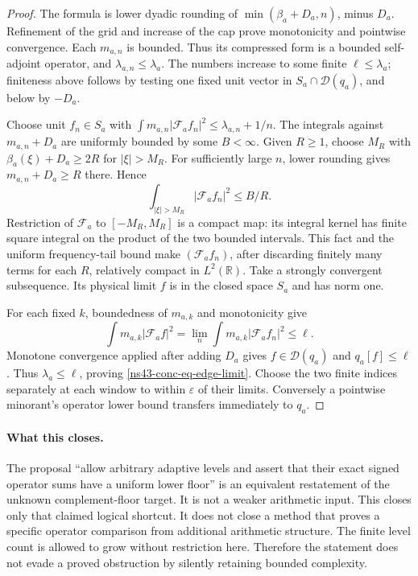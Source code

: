 \begin{proof}
The formula is lower dyadic rounding of
$\min(\beta_a+D_a,n)$, minus $D_a$. Refinement of the grid and
increase of the cap prove monotonicity and pointwise convergence.
Each $m_{a,n}$ is bounded. Thus its compressed form is a bounded
self-adjoint operator, and $\lambda_{a,n}\le\lambda_a$.
The numbers increase to some finite $\ell\le\lambda_a$; finiteness
above follows by testing one fixed unit vector in
$S_a\cap\mathcal D(q_a)$, and below by $-D_a$.

Choose unit $f_n\in S_a$ with
$\int m_{a,n}|\mathcal F_af_n|^2\le\lambda_{a,n}+1/n$.
The integrals against $m_{a,n}+D_a$ are uniformly bounded by some
$B<\infty$. Given $R\ge1$, choose $M_R$ with
$\beta_a(\xi)+D_a\ge2R$ for $|\xi|>M_R$.
For sufficiently large $n$, lower rounding gives
$m_{a,n}+D_a\ge R$ there. Hence
\[
 \int_{|\xi|>M_R}|\mathcal F_af_n|^2\le B/R.
\]
Restriction of $\mathcal F_a$ to $[-M_R,M_R]$ is a compact map:
its integral kernel has finite square integral on the product of
the two bounded intervals. This fact and the uniform frequency-tail
bound make $(\mathcal F_af_n)$, after discarding finitely many
terms for each $R$, relatively compact in $L^2(\mathbb R)$.
Take a strongly convergent subsequence. Its physical limit $f$ is
in the closed space $S_a$ and has norm one.

For each fixed $k$, boundedness of $m_{a,k}$ and monotonicity give
\[
 \int m_{a,k}|\mathcal F_af|^2
 =\lim_n\int m_{a,k}|\mathcal F_af_n|^2\le\ell.
\]
Monotone convergence applied after adding $D_a$ gives
$f\in\mathcal D(q_a)$ and $q_a[f]\le\ell$.
Thus $\lambda_a\le\ell$, proving \eqref{ns43-conc-eq-edge-limit}.
Choose the two finite indices separately at each window to within
$\varepsilon$ of their limits. Conversely a pointwise minorant's
operator lower bound transfers immediately to $q_a$.
\end{proof}

\paragraph{What this closes.}
The proposal ``allow arbitrary adaptive levels and assert that their
exact signed operator sums have a uniform lower floor'' is an
equivalent restatement of the unknown complement-floor target.
It is not a weaker arithmetic input. This closes only that claimed
logical shortcut. It does not close a method that proves a specific
operator comparison from additional arithmetic structure.
The finite level count is allowed to grow without restriction here.
Therefore the statement does not evade a proved obstruction by
silently retaining bounded complexity.

